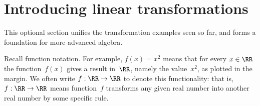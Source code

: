 

\section{Introducing linear transformations}
\label{sec:ilt}
\secttoc
\begin{comment}
\pooliv{\S3.6} \layiv{\S1.8--9} \holti{\S3.1}
\end{comment}


\begin{aside}
This optional section unifies the transformation examples seen so far, and forms a foundation for more advanced algebra. 
\end{aside}

Recall function notation.
For example, \(f(x)=x^2\) means that for every \(x\in\RR\) the function~\(f(x)\) gives a result in~\(\RR\), namely the value~\(x^2\), as plotted in the margin.  
%
We often write \(f:\RR\to\RR\) to denote this functionality: that is, \(f:\RR\to\RR\) means function~\(f\) transforms any given real number into another real number by some specific rule.

